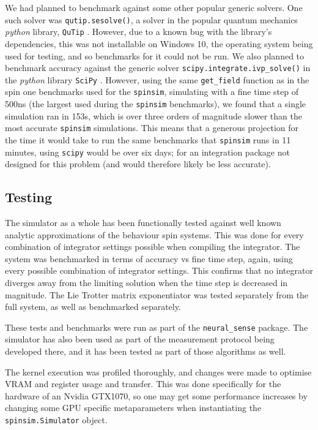 \documentclass{jors}
\begin{document}
			We had planned to benchmark against some other popular generic solvers. One such solver was \texttt{qutip.sesolve()}, a solver in the popular quantum mechanics \emph{python} library, \texttt{QuTip} \cite{johansson_qutip_2013}. However, due to a known bug with the library’s dependencies, this was not installable on Windows 10, the operating system being used for testing, and so benchmarks for it could not be run. We also planned to benchmark accuracy against the generic solver \texttt{scipy.integrate.ivp\_solve()} in the \emph{python} library \texttt{SciPy} \cite{virtanen_scipy_2020}. However, using the same \texttt{get\_field} function as in the spin one benchmarks used for the \texttt{spinsim}, simulating with a fine time step of 500ns (the largest used during the \texttt{spinsim} benchmarks), we found that a single simulation ran in 153s, which is over three orders of magnitude slower than the most accurate \texttt{spinsim} simulations. This means that a generous projection for the time it would take to run the same benchmarks that \texttt{spinsim} runs in 11 minutes, using \texttt{scipy} would be over six days; for an integration package not designed for this problem (and would therefore likely be less accurate).

	\subsection*{Testing}
		The simulator as a whole has been functionally tested against well known analytic approximations of the behaviour spin systems. This was done for every combination of integrator settings possible when compiling the integrator. The system was benchmarked in terms of accuracy vs fine time step, again, using every possible combination of integrator settings. This confirms that no integrator diverges away from the limiting solution when the time step is decreased in magnitude. The Lie Trotter matrix exponentiator was tested separately from the full system, as well as benchmarked separately.

		These tests and benchmarks were run as part of the \texttt{neural\_sense} package. The simulator has also been used as part of the measurement protocol being developed there, and it has been tested as part of those algorithms as well.

		The kernel execution was profiled thoroughly, and changes were made to optimise VRAM and register usage and transfer. This was done specifically for the hardware of an Nvidia GTX1070, so one may get some performance increases by changing some GPU specific metaparameters when instantiating the \texttt{spinsim.Simulator} object.
\end{document}
